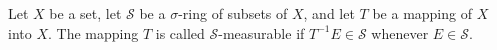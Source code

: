 Let $X$ be a set, let $\mathcal{S}$ be a $\sigma$-ring of subsets of $X$, and let $T$ be a mapping of $X$ into $X$. The mapping $T$ is called $\mathcal{S}$-measurable if $T^{-1}E \in \mathcal{S}$ whenever $E \in \mathcal{S}$.